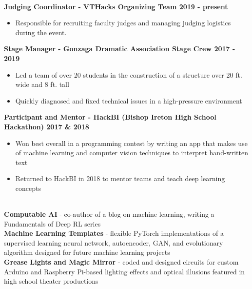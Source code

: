 \documentclass{article}
\begin{document}
\begin{center}
\begin{flushleft}
    {\large\textbf{\underline{}}} \\

    \textbf{Judging Coordinator - VTHacks Organizing Team \hfill 2019 - present}
    \begin{itemize}
      \itemsep0em
      \item Responsible for recruiting faculty judges and managing judging logistics during the event.
    \end{itemize}
    
    \textbf{Stage Manager - Gonzaga Dramatic Association Stage Crew \hfill 2017 - 2019}
    \begin{itemize}
      \itemsep0em
      \item Led a team of over 20 students in the construction of a structure over 20 ft. wide and 8 ft. tall
      \item Quickly diagnosed and fixed technical issues in a high-pressure environment
    \end{itemize}

    \textbf{Participant and Mentor - HackBI  (Bishop Ireton High School Hackathon) \hfill 2017 \& 2018}
    \begin{itemize}
      \itemsep0em
      \item Won best overall in a programming contest by writing an app that makes use of machine learning and computer vision techniques to interpret hand-written text
      \item Returned to HackBI in 2018 to mentor teams and teach deep learning concepts
    \end{itemize}


    {\large\textbf{\underline{}}} \\
    \textbf{Computable AI} - co-author of a blog on machine learning, writing a Fundamentals of Deep RL series \\
    \textbf{Machine Learning Templates} - flexible PyTorch implementations of a supervised learning neural network, autoencoder, GAN, and evolutionary algorithm designed for future machine learning projects \\
    \textbf{Grease Lights and Magic Mirror} - coded and designed circuits for custom Arduino and Raspberry Pi-based lighting effects and optical illusions featured in high school theater productions

  \end{flushleft}
  \end{center}
\end{document}
